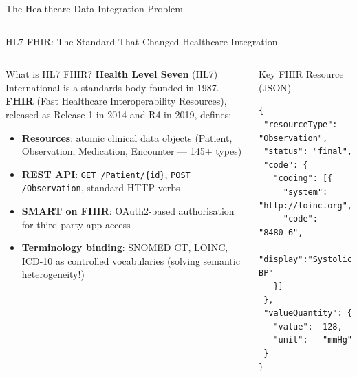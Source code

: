 \documentclass[aspectratio=169,10pt]{beamer}
\begin{document}
\begin{frame}{The Healthcare Data Integration Problem}
\begin{columns}[T]
\begin{center}
      \end{center}
  \end{columns}
\end{frame}

\begin{frame}[fragile]{HL7 FHIR: The Standard That Changed Healthcare Integration}
  \begin{columns}[T]
      \begin{block}{What is HL7 FHIR?}
        \textbf{Health Level Seven} (HL7) International is a standards
        body founded in 1987.
        \textbf{FHIR} (Fast Healthcare Interoperability Resources),
        released as Release 1 in 2014 and R4 in 2019, defines:
        \begin{itemize}
          \item \textbf{Resources}: atomic clinical data objects
                (Patient, Observation, Medication, Encounter — 145+ types)
          \item \textbf{REST API}: \texttt{GET /Patient/\{id\}},
                \texttt{POST /Observation}, standard HTTP verbs
          \item \textbf{SMART on FHIR}: OAuth2-based authorisation
                for third-party app access
          \item \textbf{Terminology binding}: SNOMED CT, LOINC, ICD-10
                as controlled vocabularies (solving semantic heterogeneity!)
        \end{itemize}
      \end{block}

      \begin{exampleblock}{Key FHIR Resource (JSON)}
        \scriptsize
        \begin{verbatim}
{
 "resourceType": "Observation",
 "status": "final",
 "code": {
   "coding": [{
     "system": "http://loinc.org",
     "code":   "8480-6",
     "display":"Systolic BP"
   }]
 },
 "valueQuantity": {
   "value":  128,
   "unit":   "mmHg"
 }
}
        \end{verbatim}
      \end{exampleblock}
  \end{columns}
\end{frame}
\end{document}
